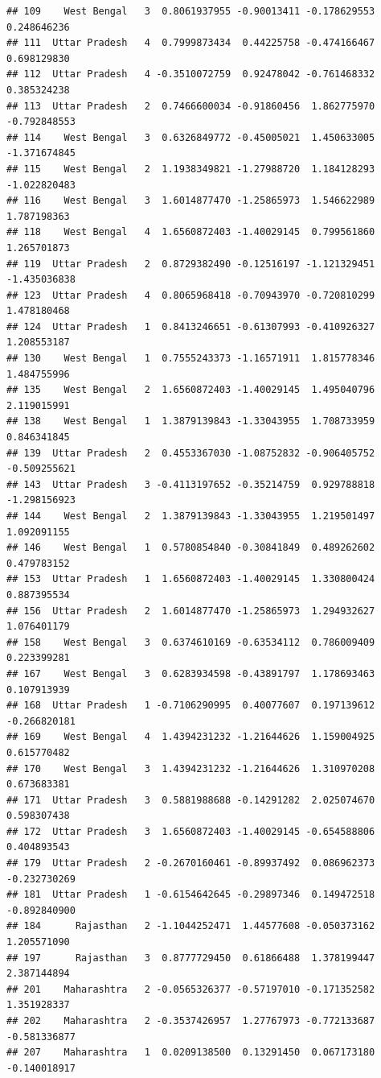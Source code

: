 \documentclass[
]{article}
\begin{document}
\begin{verbatim}
## 109    West Bengal   3  0.8061937955 -0.90013411 -0.178629553  0.248646236
## 111  Uttar Pradesh   4  0.7999873434  0.44225758 -0.474166467  0.698129830
## 112  Uttar Pradesh   4 -0.3510072759  0.92478042 -0.761468332  0.385324238
## 113  Uttar Pradesh   2  0.7466600034 -0.91860456  1.862775970 -0.792848553
## 114    West Bengal   3  0.6326849772 -0.45005021  1.450633005 -1.371674845
## 115    West Bengal   2  1.1938349821 -1.27988720  1.184128293 -1.022820483
## 116    West Bengal   3  1.6014877470 -1.25865973  1.546622989  1.787198363
## 118    West Bengal   4  1.6560872403 -1.40029145  0.799561860  1.265701873
## 119  Uttar Pradesh   2  0.8729382490 -0.12516197 -1.121329451 -1.435036838
## 123  Uttar Pradesh   4  0.8065968418 -0.70943970 -0.720810299  1.478180468
## 124  Uttar Pradesh   1  0.8413246651 -0.61307993 -0.410926327  1.208553187
## 130    West Bengal   1  0.7555243373 -1.16571911  1.815778346  1.484755996
## 135    West Bengal   2  1.6560872403 -1.40029145  1.495040796  2.119015991
## 138    West Bengal   1  1.3879139843 -1.33043955  1.708733959  0.846341845
## 139  Uttar Pradesh   2  0.4553367030 -1.08752832 -0.906405752 -0.509255621
## 143  Uttar Pradesh   3 -0.4113197652 -0.35214759  0.929788818 -1.298156923
## 144    West Bengal   2  1.3879139843 -1.33043955  1.219501497  1.092091155
## 146    West Bengal   1  0.5780854840 -0.30841849  0.489262602  0.479783152
## 153  Uttar Pradesh   1  1.6560872403 -1.40029145  1.330800424  0.887395534
## 156  Uttar Pradesh   2  1.6014877470 -1.25865973  1.294932627  1.076401179
## 158    West Bengal   3  0.6374610169 -0.63534112  0.786009409  0.223399281
## 167    West Bengal   3  0.6283934598 -0.43891797  1.178693463  0.107913939
## 168  Uttar Pradesh   1 -0.7106290995  0.40077607  0.197139612 -0.266820181
## 169    West Bengal   4  1.4394231232 -1.21644626  1.159004925  0.615770482
## 170    West Bengal   3  1.4394231232 -1.21644626  1.310970208  0.673683381
## 171  Uttar Pradesh   3  0.5881988688 -0.14291282  2.025074670  0.598307438
## 172  Uttar Pradesh   3  1.6560872403 -1.40029145 -0.654588806  0.404893543
## 179  Uttar Pradesh   2 -0.2670160461 -0.89937492  0.086962373 -0.232730269
## 181  Uttar Pradesh   1 -0.6154642645 -0.29897346  0.149472518 -0.892840900
## 184      Rajasthan   2 -1.1044252471  1.44577608 -0.050373162  1.205571090
## 197      Rajasthan   3  0.8777729450  0.61866488  1.378199447  2.387144894
## 201    Maharashtra   2 -0.0565326377 -0.57197010 -0.171352582  1.351928337
## 202    Maharashtra   2 -0.3537426957  1.27767973 -0.772133687 -0.581336877
## 207    Maharashtra   1  0.0209138500  0.13291450  0.067173180 -0.140018917

\end{verbatim}
\end{document}
